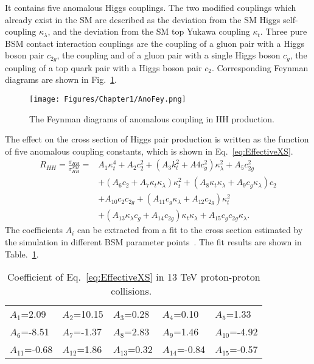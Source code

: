 It contains five anomalous Higgs couplings.
The two modified couplings which already exist in the SM are described as the deviation from the SM Higgs self-coupling $\kappa_{\lambda}$, and the deviation from the SM top Yukawa coupling $\kappa_{t}$.
Three pure BSM contact interaction couplings are the coupling of a gluon pair with a Higgs boson pair $c_{2g}$, the coupling and of a gluon pair with a single Higgs boson $c_{g}$, the coupling of a top quark pair with a Higgs boson pair $c_{2}$.
Corresponding Feynman diagrams are shown in Fig.~\ref{fig:anomalousFey}.

\begin{figure}[h]
  \centering
  \texttt{[image: Figures/Chapter1/AnoFey.png]}
  \caption{The Feynman diagrams of anomalous coupling in HH production.}
  \label{fig:anomalousFey}
\end{figure}

The effect on the cross section of Higgs pair production is written as the function of five anomalous coupling constants, which is shown in Eq.~\ref{eq:EffectiveXS}.~\cite{1507.02245, 1608.06578} %
\begin{equation} \label{eq:EffectiveXS}
  \begin{aligned}
	R_{HH}=\frac{\sigma_{HH}}{\sigma^{SM}_{HH}} = 
	& A_{1}\kappa_{t}^{4} + A_{2}c_{2}^{2} + (A_{3}k_{t}^{2}+A{4}c_{g}^{2})\kappa_{\lambda}^{2}+A_{5}c_{2g}^{2}
	\\& + (A_{6}c_{2}+A_{7}\kappa_{t}\kappa_{\lambda})\kappa_{t}^{2} + (A_{8}\kappa_{t}\kappa_{\lambda}+A_{9}c_{g}\kappa_{\lambda})c_{2}
	\\& + A_{10}c_{2}c_{2g}+(A_{11}c_{g}\kappa_{\lambda}+A_{12}c_{2g})\kappa_{t}^{2}
	\\& + (A_{13}\kappa_{\lambda}c_{g}+A_{14}c_{2g})\kappa_{t}\kappa_{\lambda}+A_{15}c_{g}c_{2g}\kappa_{\lambda} .
  \end{aligned}
\end{equation}
The coefficients $A_{i}$ can be extracted from a fit to the cross section estimated by the simulation in different BSM parameter points~\cite{1608.06578}.
The fit results are shown in Table.~\ref{tab:CoeffNonResXS}.

\begin{table}[h]
\centering
\caption{Coefficient of Eq.~\ref{eq:EffectiveXS} in 13 TeV proton-proton collisions.~\cite{1608.06578}}
\label{tab:CoeffNonResXS}
\begin{tabular}{|lllll|}
\hline
$A_{1}$=2.09  & $A_{2}$=10.15 & $A_{3}$=0.28 & $A_{4}$=0.10  & $A_{5}$=1.33  \\
$A_{6}$=-8.51 & $A_{7}$=-1.37 & $A_{8}$=2.83 & $A_{9}$=1.46  & $A_{10}$=-4.92 \\
$A_{11}$=-0.68 & $A_{12}$=1.86  & $A_{13}$=0.32 & $A_{14}$=-0.84 & $A_{15}$=-0.57 \\ \hline
\end{tabular}
\end{table}

